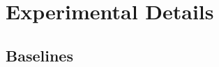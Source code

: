\section{Experimental Details}
\label{app:exp_details}

\subsection{Baselines}
\label{app:baseline_details}



